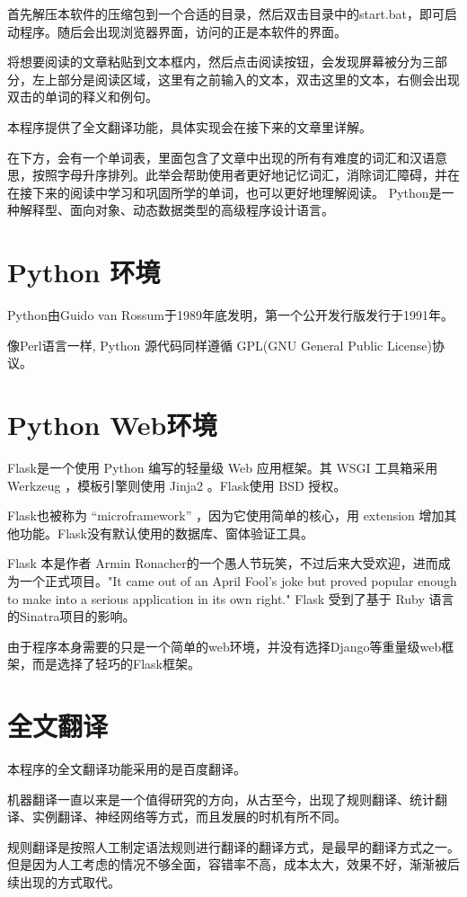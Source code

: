 \documentclass[a4paper, 11pt， oneside]{article}
\begin{document}
    首先解压本软件的压缩包到一个合适的目录，然后双击目录中的start.bat，即可启动程序。随后会出现浏览器界面，访问的正是本软件的界面。

    将想要阅读的文章粘贴到文本框内，然后点击阅读按钮，会发现屏幕被分为三部分，左上部分是阅读区域，这里有之前输入的文本，双击这里的文本，右侧会出现双击的单词的释义和例句。

    本程序提供了全文翻译功能，具体实现会在接下来的文章里详解。

    在下方，会有一个单词表，里面包含了文章中出现的所有有难度的词汇和汉语意思，按照字母升序排列。此举会帮助使用者更好地记忆词汇，消除词汇障碍，并在在接下来的阅读中学习和巩固所学的单词，也可以更好地理解阅读。
    Python是一种解释型、面向对象、动态数据类型的高级程序设计语言。
\section{Python 环境}
    Python由Guido van Rossum于1989年底发明，第一个公开发行版发行于1991年。
    
    像Perl语言一样, Python 源代码同样遵循 GPL(GNU General Public License)协议。
    
\section{Python Web环境}
    Flask是一个使用 Python 编写的轻量级 Web 应用框架。其 WSGI 工具箱采用 Werkzeug ，模板引擎则使用 Jinja2 。Flask使用 BSD 授权。
    
    Flask也被称为 “microframework” ，因为它使用简单的核心，用 extension 增加其他功能。Flask没有默认使用的数据库、窗体验证工具。

    Flask 本是作者 Armin Ronacher的一个愚人节玩笑，不过后来大受欢迎，进而成为一个正式项目。"It came out of an April Fool's joke but proved popular enough to make into a serious application in its own right." Flask 受到了基于 Ruby 语言的Sinatra项目的影响。

    由于程序本身需要的只是一个简单的web环境，并没有选择Django等重量级web框架，而是选择了轻巧的Flask框架。
\section{全文翻译}
    本程序的全文翻译功能采用的是百度翻译。

    机器翻译一直以来是一个值得研究的方向，从古至今，出现了规则翻译、统计翻译、实例翻译、神经网络等方式，而且发展的时机有所不同。

    规则翻译是按照人工制定语法规则进行翻译的翻译方式，是最早的翻译方式之一。但是因为人工考虑的情况不够全面，容错率不高，成本太大，效果不好，渐渐被后续出现的方式取代。
\end{document}
